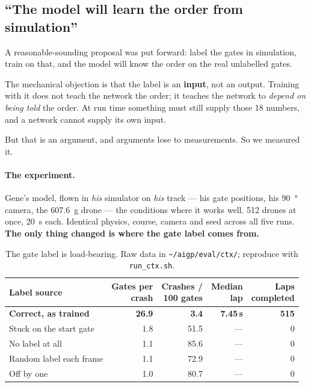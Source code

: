\subsection{``The model will learn the order from simulation''}

A reasonable-sounding proposal was put forward: label the gates in simulation,
train on that, and the model will know the order on the real unlabelled gates.

The mechanical objection is that the label is an \textbf{input}, not an output.
Training with it does not teach the network the order; it teaches the network to
\emph{depend on being told} the order. At run time something must still supply
those 18 numbers, and a network cannot supply its own input.

But that is an argument, and arguments lose to measurements. So we measured it.

\paragraph{The experiment.} Gene's model, flown in \emph{his} simulator on
\emph{his} track --- his gate positions, his \SI{90}{\degree} camera, the
\SI{607.6}{g} drone --- the conditions where it works well. 512 drones at once,
\SI{20}{s} each. Identical physics, course, camera and seed across all five runs.
\textbf{The only thing changed is where the gate label comes from.}

\begin{table}[H]\centering\footnotesize
\begin{tabular}{@{}lrrrr@{}}
\toprule
Label source & \makecell{Gates per\\crash} & \makecell{Crashes /\\100 gates} & \makecell{Median\\lap} & \makecell{Laps\\completed} \\
\midrule
\textbf{Correct, as trained} & \textbf{26.9} & \textbf{3.4} & \textbf{7.45\,s} & \textbf{515} \\
Stuck on the start gate & 1.8 & 51.5 & --- & 0 \\
No label at all & 1.1 & 85.6 & --- & 0 \\
Random label each frame & 1.1 & 72.9 & --- & 0 \\
Off by one & 1.0 & 80.7 & --- & 0 \\
\bottomrule
\end{tabular}
\caption{The gate label is load-bearing. Raw data in \nolinkurl{~/aigp/eval/ctx/}; reproduce with \nolinkurl{run_ctx.sh}.}\label{tab:ctx}
\end{table}

